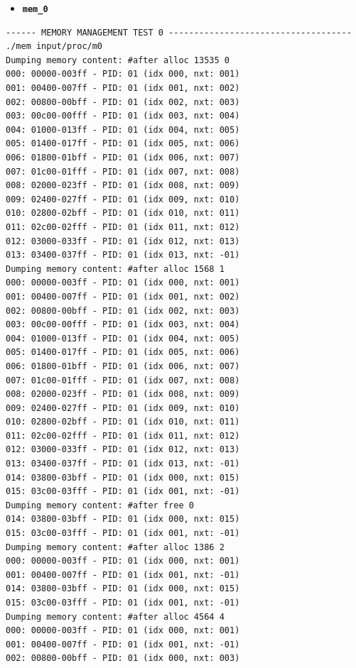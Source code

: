 \documentclass[a4paper]{article}
\numberwithin{equation}{section}
\begin{document}
\begin{itemize}
  \item \textbf{\texttt{mem_0}}
\end{itemize}

\begin{mdframed}[leftline=false,rightline=false,backgroundcolor=teal!10,nobreak=false]
  \begin{verbatim}
------ MEMORY MANAGEMENT TEST 0 ------------------------------------
./mem input/proc/m0
Dumping memory content: #after alloc 13535 0
000: 00000-003ff - PID: 01 (idx 000, nxt: 001)
001: 00400-007ff - PID: 01 (idx 001, nxt: 002)
002: 00800-00bff - PID: 01 (idx 002, nxt: 003)
003: 00c00-00fff - PID: 01 (idx 003, nxt: 004)
004: 01000-013ff - PID: 01 (idx 004, nxt: 005)
005: 01400-017ff - PID: 01 (idx 005, nxt: 006)
006: 01800-01bff - PID: 01 (idx 006, nxt: 007)
007: 01c00-01fff - PID: 01 (idx 007, nxt: 008)
008: 02000-023ff - PID: 01 (idx 008, nxt: 009)
009: 02400-027ff - PID: 01 (idx 009, nxt: 010)
010: 02800-02bff - PID: 01 (idx 010, nxt: 011)
011: 02c00-02fff - PID: 01 (idx 011, nxt: 012)
012: 03000-033ff - PID: 01 (idx 012, nxt: 013)
013: 03400-037ff - PID: 01 (idx 013, nxt: -01)
Dumping memory content: #after alloc 1568 1
000: 00000-003ff - PID: 01 (idx 000, nxt: 001)
001: 00400-007ff - PID: 01 (idx 001, nxt: 002)
002: 00800-00bff - PID: 01 (idx 002, nxt: 003)
003: 00c00-00fff - PID: 01 (idx 003, nxt: 004)
004: 01000-013ff - PID: 01 (idx 004, nxt: 005)
005: 01400-017ff - PID: 01 (idx 005, nxt: 006)
006: 01800-01bff - PID: 01 (idx 006, nxt: 007)
007: 01c00-01fff - PID: 01 (idx 007, nxt: 008)
008: 02000-023ff - PID: 01 (idx 008, nxt: 009)
009: 02400-027ff - PID: 01 (idx 009, nxt: 010)
010: 02800-02bff - PID: 01 (idx 010, nxt: 011)
011: 02c00-02fff - PID: 01 (idx 011, nxt: 012)
012: 03000-033ff - PID: 01 (idx 012, nxt: 013)
013: 03400-037ff - PID: 01 (idx 013, nxt: -01)
014: 03800-03bff - PID: 01 (idx 000, nxt: 015)
015: 03c00-03fff - PID: 01 (idx 001, nxt: -01)
Dumping memory content: #after free 0
014: 03800-03bff - PID: 01 (idx 000, nxt: 015)
015: 03c00-03fff - PID: 01 (idx 001, nxt: -01)
Dumping memory content: #after alloc 1386 2
000: 00000-003ff - PID: 01 (idx 000, nxt: 001)
001: 00400-007ff - PID: 01 (idx 001, nxt: -01)
014: 03800-03bff - PID: 01 (idx 000, nxt: 015)
015: 03c00-03fff - PID: 01 (idx 001, nxt: -01)
Dumping memory content: #after alloc 4564 4
000: 00000-003ff - PID: 01 (idx 000, nxt: 001)
001: 00400-007ff - PID: 01 (idx 001, nxt: -01)
002: 00800-00bff - PID: 01 (idx 000, nxt: 003)

\end{verbatim}
\end{mdframed}
\end{document}
